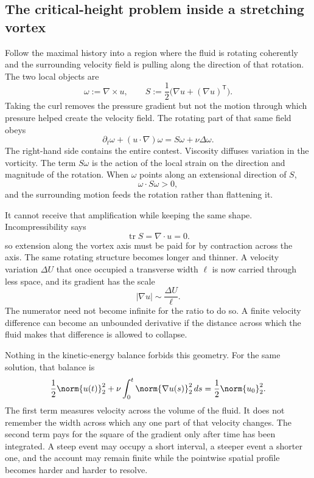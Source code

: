 \subsection{The critical-height problem inside a stretching vortex}\label{sub:ThePerfectlyStretchingVortex}

Follow the maximal history into a region where the fluid is rotating
coherently and the surrounding velocity field is pulling along the direction
of that rotation.  The two local objects are
\[
  \omega:=\nabla\times u,
  \qquad
  S:=\frac12\bigl(\nabla u+(\nabla u)^{\mathsf T}\bigr).
\]
Taking the curl removes the pressure gradient but not the motion through which
pressure helped create the velocity field.  The rotating part of that same
field obeys
\begin{equation}\label{eq:BodyVorticityEquation}
  \partial_t\omega+(u\cdot\nabla)\omega
  =S\omega+\nu\Delta\omega.
\end{equation}
The right-hand side contains the entire contest.  Viscosity diffuses variation
in the vorticity.  The term \(S\omega\) is the action of the local strain on
the direction and magnitude of the rotation.  When \(\omega\) points along an
extensional direction of \(S\),
\[
  \omega\cdot S\omega>0,
\]
and the surrounding motion feeds the rotation rather than flattening it.

It cannot receive that amplification while keeping the same shape.
Incompressibility says
\[
  \operatorname{tr}S=\nabla\cdot u=0.
\]
so extension along the vortex axis must be paid for by contraction across the
axis.  The same rotating structure becomes longer and thinner.  A velocity
variation \(\Delta U\) that once occupied a transverse width \(\ell\) is now
carried through less space, and its gradient has the scale
\[
  |\nabla u|\sim\frac{\Delta U}{\ell}.
\]
The numerator need not become infinite for the ratio to do so.  A finite
velocity difference can become an unbounded derivative if the distance across
which the fluid makes that difference is allowed to collapse.

Nothing in the kinetic-energy balance forbids this geometry.  For the same
solution, that balance is
\begin{equation}\label{eq:BodyEnergyIdentity}
  \frac12\norm{u(t)}_2^2
  +\nu\int_0^t\norm{\nabla u(s)}_2^2\,ds
  =\frac12\norm{u_0}_2^2.
\end{equation}
The first term measures velocity across the volume of the fluid.  It does not
remember the width across which any one part of that velocity changes.  The
second term pays for the square of the gradient only after time has been
integrated.  A steep event may occupy a short interval, a steeper event a
shorter one, and the account may remain finite while the pointwise spatial
profile becomes harder and harder to resolve.

